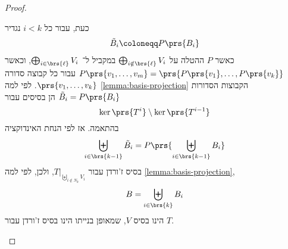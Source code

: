 \documentclass[a4paper,10pt,twoside,openany]{article}
\begin{document}
\begin{proof}
\begin{description}
כעת, עבור כל
$i < k$
נגדיר
\begin{align*}
\tilde{B}_i \coloneqq P\prs{B_i}
\end{align*}
כאשר
$P$
ההטלה על
$\bigoplus_{i \notin \brs{\ell}} V_i$
במקביל ל־%
$\bigoplus_{i \in \brs{\ell}} V_i$,
וכאשר
$P\prs{v_1, \ldots, v_m} = \prs{P\prs{v_1}, \ldots, P\prs{v_k}}$
עבור כל קבוצה סדורה
$\prs{v_1, \ldots, v_k}$.
לפי למה
\ref{lemma:basis-projection}
הקבוצות הסדורות
$\tilde{B}_i = P\prs{B_i}$
הן בסיסים עבור
\[\ker\prs{T^i} \setminus \ker\prs{T^{i-1}}\]
בהתאמה.
אז לפי הנחת האינדוקציה
\[\biguplus_{i \in \brs{k-1}} \tilde{B}_i = P\prs{\biguplus_{i \in \brs{k-1}} B_i}\]
בסיס ז'ורדן עבור
$T|_{\biguplus_{i \notin N_k} V_i}$,
ולכן, לפי למה
\ref{lemma:basis-projection},
\[B = \biguplus_{i \in \brs{k}} B_i\]
הינו בסיס
$V$,
שמאופן בנייתו הינו בסיס ז'ורדן עבור
$T$.
\end{description}
\end{proof}
\end{document}
